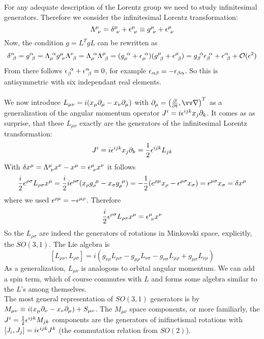 For any adequate description of the Lorentz group we need to study infinitesimal generators. Therefore we consider the infinitesimal Lorentz transformation:
\[ \Lambda^\mu_{~\nu} = \delta^\mu_{~\nu} + \epsilon^\mu_{~\nu} \equiv g^\mu_{~\nu} + \epsilon^\mu_{~\nu}\]
Now, the condition $g = L^T g L$ can be rewritten as 
\[ \delta^\alpha_{~\beta} = g^\alpha_{~\beta} = \Lambda_\mu^{~\alpha} g^\mu_{~\nu}\Lambda^\nu_{~\beta} = \Lambda_\mu^{~\alpha}\Lambda^\mu_{~\beta} = ( g_\mu^{~\alpha} + \epsilon_\mu^{~\alpha})(g^\mu_{~\beta} + \epsilon^\mu_{~\beta}) = g_\beta^{~\alpha} \epsilon_\beta^{~\alpha} + \epsilon^\alpha_{~\beta} + \mathcal{O}(\epsilon^2)\]
From there follows $\epsilon_\beta^{~\alpha} + \epsilon^\alpha_{~\beta} = 0$, for example $\epsilon_{\alpha\beta} = - \epsilon_{\beta\alpha}$. So this is antisymmetric with six independant real elements.\\
\\
We now introduce $L_{\mu\nu} = i ( x_\mu \partial_\mu - x_\nu\partial_\mu)$ with $\p_\mu = \left( \frac{\p}{\p t}, \vn\right)^T$ as a generalization of the angular momentum operator $J^i =i \epsilon^{ijk} x_j \partial_k$. It comes as as surprise, that these $L_{\mu\nu}$ exactly are the generators of the infinitesimal Lorentz transformation:
\[J^i = i \epsilon^{ijk} x_j \partial _k = \frac{1}{2}\epsilon^{ijk} L_{jk}\]
With $\delta x^\mu = \Lambda^\mu_{~\nu} x^\nu - x^\mu = \epsilon^\mu_{~\nu} x^\nu$ it follows
\[ \frac{i}{2} e^{\rho\sigma} L_{\rho\sigma} x^\mu = \frac{i}{2} i \epsilon^{\rho\sigma} ( x_\rho g_\sigma^{~\mu}- x_\sigma g_\rho^{~\mu}) = - \frac{1}{2} (e^{\rho\mu} x_\rho - \epsilon^{\mu\sigma}x_\sigma )= \epsilon^{\mu\sigma}x_\sigma = \delta x^\mu\]
where we used $\epsilon^{\rho\mu} = - \epsilon^{\mu\rho}$. Therefore
\[ \frac{i}{2}\epsilon^{\rho\sigma} L_{\rho\sigma} x^\mu = \epsilon^\mu_{~\nu} x^\nu\]
So the $L_{\rho\sigma}$ are indeed the generators of rotations in Minkovski space, explicitly, the $SO(3,1)$. The Lie algebra is
\[ [L_{\mu\nu}, L_{\rho\sigma}] = i ( g_{\nu\rho} L_{\mu\sigma} - g_{\mu\rho}L_{\nu\sigma} - g_{\nu\sigma}L_{\mu\rho} + g_{\mu\sigma}L_{\nu\rho})\]
\newline
As a generalization, $L_{\mu\nu}$ is analogous to orbital angular momentum. We can add a spin term, which of course commutes with $L$ and forms some algebra similar to the $L$'s among themselves.\\
The most general representation of $SO(3,1)$ generators is by $M_{\mu\nu} \equiv i(x_\mu \partial_\nu - x_\nu\partial_\mu) + S_{\mu\nu}$. The $M_{\mu\nu}$ space components, or more familiarly, the $J^i = \frac{1}{2} \epsilon^{ijk} M_{jk}$ components are the generators of inifinetismal rotations with $[J_i, J_j] = i \epsilon^{ijk} J^k$ (the commutation relation from $SO(2)$).\\
